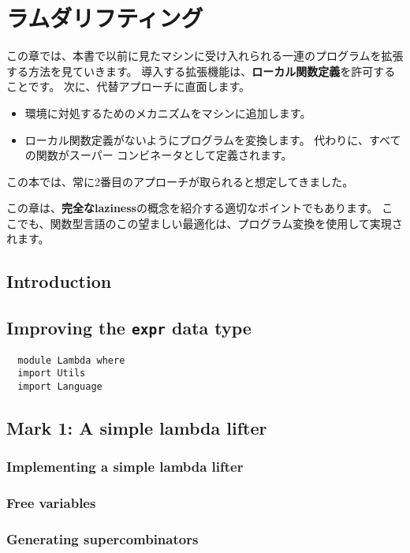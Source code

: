 \documentclass{jarticle}
\begin{document}
\section{ラムダリフティング}

この章では、本書で以前に見たマシンに受け入れられる一連のプログラムを拡張する方法を見ていきます。
導入する拡張機能は、\textbf{ローカル関数定義}を許可することです。
次に、代替アプローチに直面します。

\begin{itemize}
	\item 環境に対処するためのメカニズムをマシンに追加します。
	\item ローカル関数定義がないようにプログラムを変換します。
	      代わりに、すべての関数がスーパー コンビネータとして定義されます。
\end{itemize}

この本では、常に2番目のアプローチが取られると想定してきました。

この章は、\textbf{完全なlaziness}の概念を紹介する適切なポイントでもあります。
ここでも、関数型言語のこの望ましい最適化は、プログラム変換を使用して実現されます。

\subsection{Introduction}
\newpage

\subsection{Improving the \texttt{expr} data type}

\begin{verbatim}
  module Lambda where
  import Utils
  import Language
\end{verbatim}
\newpage

\subsection{Mark 1: A simple lambda lifter}
\subsubsection{Implementing a simple lambda lifter}
\subsubsection{Free variables}
\subsubsection{Generating supercombinators}
\end{document}
